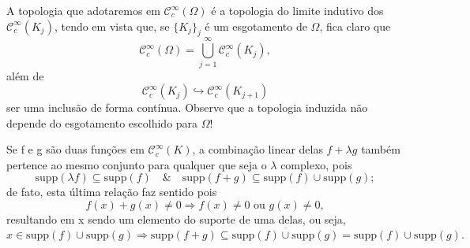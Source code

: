 \documentclass[../distribution_theory_notes.tex]{subfiles}
\begin{document}
A topologia que adotaremos em \(\mathcal{C}_{c}^{\infty}(\Omega )\) é a topologia do limite indutivo dos \(\mathcal{C}_{c}^{\infty}(K_{j})\), tendo em vista que, se \(\{K_{j}\}_{j}\) é um esgotamento de \(\Omega \), fica claro que 
  \[
    \mathcal{C}_{c}^{\infty}(\Omega )=\bigcup_{j=1}^{\infty}\mathcal{C}_{c}^{\infty}(K_{j}),
  \]
  além de 
    \[
      \mathcal{C}_{c}^{\infty}(K_{j})\hookrightarrow \mathcal{C}_{c}^{\infty}(K_{j+1})
    \]
    ser uma inclusão de forma contínua. Observe que a topologia induzida não depende do esgotamento escolhido para \(\Omega \)!
     \begin{tcolorbox}[
     skin=enhanced,
     title=Observação,
     fonttitle=\bfseries,
   colframe=black,
     colbacktitle=cyan!75!white, 
     colback=cyan!15,
     colbacklower=black,
   coltitle=black,
     drop fuzzy shadow,
     ]
     Se f e g são duas funções em \(\mathcal{C}_{c}^{\infty}(K)\), a combinação linear delas \(f+\lambda g\) também pertence ao mesmo conjunto para qualquer que seja o \(\lambda \) complexo, pois 
       \[
         \mathrm{supp}(\lambda f)\subseteq \mathrm{supp}(f)\quad\&\quad \mathrm{supp}(f+g)\subseteq \mathrm{supp}(f)\cup \mathrm{supp}(g);
       \] 
       de fato, esta última relação faz sentido pois 
         \[
           f(x)+g(x)\neq 0 \Rightarrow f(x)\neq 0 \text{ ou }g(x)\neq 0,
         \]
         resultando em x sendo um elemento do suporte de uma delas, ou seja, 
           \[
             x\in \mathrm{supp}(f)\cup \mathrm{supp}(g)\Rightarrow \mathrm{supp}(f+g)\subseteq \overline{\mathrm{supp}(f)\cup \mathrm{supp}(g)}=\mathrm{supp}(f)\cup \mathrm{supp}(g).
           \]
     \end{tcolorbox}
\end{document}
